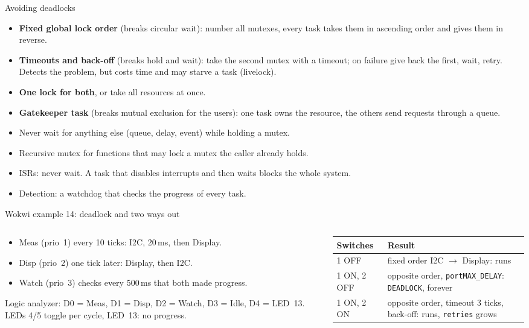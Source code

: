 \begin{frame}{Avoiding deadlocks}
  \begin{itemize}
    \item \textbf{Fixed global lock order} (breaks circular wait): number all mutexes, every task takes them in ascending order and gives them in reverse.
    \item \textbf{Timeouts and back-off} (breaks hold and wait): take the second mutex with a timeout; on failure give back the first, wait, retry. Detects the problem, but costs time and may starve a task (livelock).
    \item \textbf{One lock for both}, or take all resources at once.
    \item \textbf{Gatekeeper task} (breaks mutual exclusion for the users): one task owns the resource, the others send requests through a queue.
    \item Never wait for anything else (queue, delay, event) while holding a mutex.
    \item Recursive mutex for functions that may lock a mutex the caller already holds.
    \item ISRs: never wait. A task that disables interrupts and then waits blocks the whole system.
    \item Detection: a watchdog that checks the progress of every task.
  \end{itemize}
\end{frame}

\begin{frame}{Wokwi example 14: deadlock and two ways out}
  \begin{columns}[T]
    \begin{column}{0.50\textwidth}
      \small
      \begin{itemize}
        \item Meas (prio~1) every 10 ticks: I2C, 20\,ms, then Display.
        \item Disp (prio~2) one tick later: Display, then I2C.
        \item Watch (prio~3) checks every 500\,ms that both made progress.
      \end{itemize}
      Logic analyzer: D0 = Meas, D1 = Disp, D2 = Watch, D3 = Idle, D4 = LED~13. LEDs 4/5 toggle per cycle, LED~13: no progress.
    \end{column}
    \begin{column}{0.48\textwidth}
      \small
      \begin{tabular}{@{}l>{\raggedright\arraybackslash}p{}@{}}
        \toprule
        Switches & Result \\
        \midrule
        1 OFF & fixed order I2C $\rightarrow$ Display: runs \\
        1 ON, 2 OFF & opposite order, \texttt{portMAX\_DELAY}: \texttt{DEADLOCK}, forever \\
        1 ON, 2 ON & opposite order, timeout 3 ticks, back-off: runs, \texttt{retries} grows \\
        \bottomrule
      \end{tabular}
    \end{column}
  \end{columns}
\end{frame}


